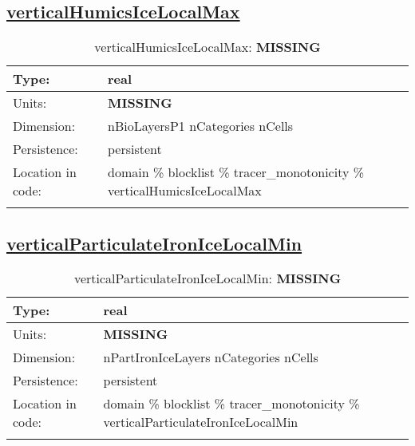\subsection[verticalHumicsIceLocalMax]{\hyperref[sec:var_tab_tracer_monotonicity]{verticalHumicsIceLocalMax}}
\label{subsec:var_sec_tracer_monotonicity_verticalHumicsIceLocalMax}
\begin{center}
\begin{longtable}{| p{2.0in} | p{4.0in} |}
        \hline 
        Type: & real \\
        \hline 
        Units: & {\bf \color{red} MISSING} \\
        \hline 
        Dimension: & nBioLayersP1 nCategories nCells \\
        \hline 
        Persistence: & persistent \\
        \hline 
         Location in code: & domain \% blocklist \% tracer\_monotonicity \% verticalHumicsIceLocalMax \\
         \hline 
    \caption{verticalHumicsIceLocalMax: {\bf \color{red} MISSING}}
\end{longtable}
\end{center}
\subsection[verticalParticulateIronIceLocalMin]{\hyperref[sec:var_tab_tracer_monotonicity]{verticalParticulateIronIceLocalMin}}
\label{subsec:var_sec_tracer_monotonicity_verticalParticulateIronIceLocalMin}
\begin{center}
\begin{longtable}{| p{2.0in} | p{4.0in} |}
        \hline 
        Type: & real \\
        \hline 
        Units: & {\bf \color{red} MISSING} \\
        \hline 
        Dimension: & nPartIronIceLayers nCategories nCells \\
        \hline 
        Persistence: & persistent \\
        \hline 
         Location in code: & domain \% blocklist \% tracer\_monotonicity \% verticalParticulateIronIceLocalMin \\
         \hline 
    \caption{verticalParticulateIronIceLocalMin: {\bf \color{red} MISSING}}
\end{longtable}
\end{center}
